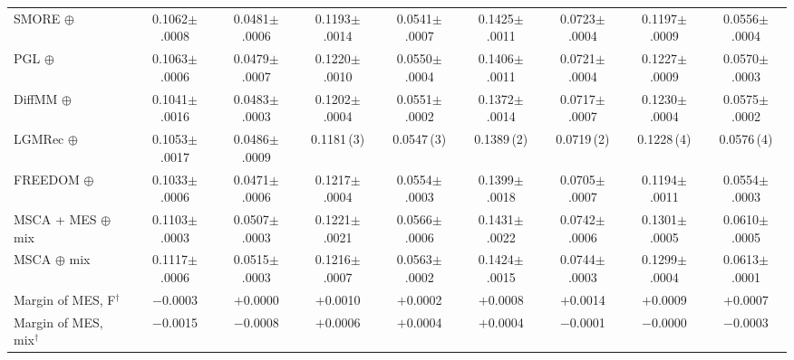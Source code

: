 \begin{table}[t]
\begin{tabular}{lcccccccc}
SMORE $\oplus$ & 0.1062{\scriptsize$\pm$.0008} & 0.0481{\scriptsize$\pm$.0006} & 0.1193{\scriptsize$\pm$.0014} & 0.0541{\scriptsize$\pm$.0007} & 0.1425{\scriptsize$\pm$.0011} & 0.0723{\scriptsize$\pm$.0004} & 0.1197{\scriptsize$\pm$.0009} & 0.0556{\scriptsize$\pm$.0004} \\
PGL $\oplus$ & 0.1063{\scriptsize$\pm$.0006} & 0.0479{\scriptsize$\pm$.0007} & 0.1220{\scriptsize$\pm$.0010} & 0.0550{\scriptsize$\pm$.0004} & 0.1406{\scriptsize$\pm$.0011} & 0.0721{\scriptsize$\pm$.0004} & 0.1227{\scriptsize$\pm$.0009} & 0.0570{\scriptsize$\pm$.0003} \\
DiffMM $\oplus$ & 0.1041{\scriptsize$\pm$.0016} & 0.0483{\scriptsize$\pm$.0003} & 0.1202{\scriptsize$\pm$.0004} & 0.0551{\scriptsize$\pm$.0002} & 0.1372{\scriptsize$\pm$.0014} & 0.0717{\scriptsize$\pm$.0007} & 0.1230{\scriptsize$\pm$.0004} & 0.0575{\scriptsize$\pm$.0002} \\
LGMRec $\oplus$ & 0.1053{\scriptsize$\pm$.0017} & 0.0486{\scriptsize$\pm$.0009} & 0.1181\,(3) & 0.0547\,(3) & 0.1389\,(2) & 0.0719\,(2) & 0.1228\,(4) & 0.0576\,(4) \\
FREEDOM $\oplus$ & 0.1033{\scriptsize$\pm$.0006} & 0.0471{\scriptsize$\pm$.0006} & 0.1217{\scriptsize$\pm$.0004} & 0.0554{\scriptsize$\pm$.0003} & 0.1399{\scriptsize$\pm$.0018} & 0.0705{\scriptsize$\pm$.0007} & 0.1194{\scriptsize$\pm$.0011} & 0.0554{\scriptsize$\pm$.0003} \\
\midrule
MSCA + MES $\oplus$ mix & 0.1103{\scriptsize$\pm$.0003} & 0.0507{\scriptsize$\pm$.0003} & 0.1221{\scriptsize$\pm$.0021} & 0.0566{\scriptsize$\pm$.0006} & 0.1431{\scriptsize$\pm$.0022} & 0.0742{\scriptsize$\pm$.0006} & 0.1301{\scriptsize$\pm$.0005} & 0.0610{\scriptsize$\pm$.0005} \\
MSCA $\oplus$ mix & 0.1117{\scriptsize$\pm$.0006} & 0.0515{\scriptsize$\pm$.0003} & 0.1216{\scriptsize$\pm$.0007} & 0.0563{\scriptsize$\pm$.0002} & 0.1424{\scriptsize$\pm$.0015} & 0.0744{\scriptsize$\pm$.0003} & 0.1299{\scriptsize$\pm$.0004} & 0.0613{\scriptsize$\pm$.0001} \\
Margin of MES, F$^{\dagger}$ & $-$0.0003 & $+$0.0000 & $+$0.0010 & $+$0.0002 & $+$0.0008 & $+$0.0014\rlap{$^{\blacktriangle}$} & $+$0.0009 & $+$0.0007\rlap{$^{\blacktriangle}$} \\
Margin of MES, mix$^{\dagger}$ & $-$0.0015\rlap{$^{\blacktriangledown}$} & $-$0.0008\rlap{$^{\blacktriangledown}$} & $+$0.0006 & $+$0.0004 & $+$0.0004 & $-$0.0001 & $-$0.0000 & $-$0.0003 \\
\bottomrule
\end{tabular}
\end{table}
